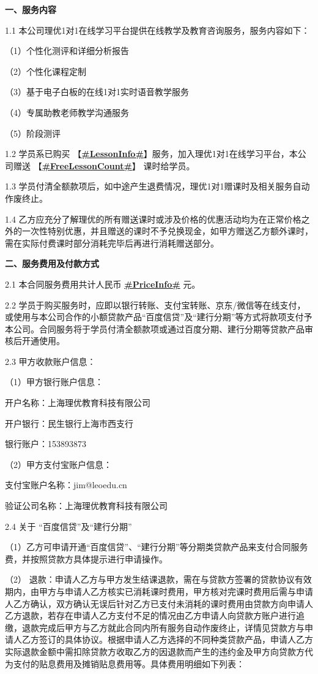 \documentclass {ctexart}
\begin{document}
\textbf{一、服务内容 }

1.1	本公司理优1对1在线学习平台提供在线教学及教育咨询服务，服务内容如下：

（1）个性化测评和详细分析报告	

（2）个性化课程定制

（3）基于电子白板的在线1对1实时语音教学服务	

（4）专属助教老师教学沟通服务

（5）阶段测评

1.2	学员系已购买 【\underline{\textbf{#LessonInfo#}}】服务，加入理优1对1在线学习平台，本公司赠送    【\underline{\textbf{#FreeLessonCount#}}】  课时给学员。

1.3	学员付清全额款项后，如中途产生退费情况，理优1对1赠课时及相关服务自动作废终止。

1.4	乙方应充分了解理优的所有赠送课时或涉及价格的优惠活动均为在正常价格之外的一次性特别优惠，并且赠送的课时不予兑换现金，如甲方赠送乙方额外课时，需在实际付费课时部分消耗完毕后再进行消耗赠送部分。


\newpage
\textbf{二、服务费用及付款方式}

2.1	本合同服务费用共计人民币 \textbf{\underline{#PriceInfo#}} 元。

2.2	学员于购买服务时，应即以银行转账、支付宝转账、京东/微信等在线支付，或使用与本公司合作的小额贷款产品“百度信贷”及“建行分期”等方式将款项支付予本公司。合同服务将于学员付清全额款项或通过百度分期、建行分期等贷款产品审核后开通使用。

2.3	甲方收款账户信息：

（1）甲方银行账户信息：

开户名称：上海理优教育科技有限公司

开户银行：民生银行上海市西支行

银行账户：153893873

（2）甲方支付宝账户信息：

支付宝账户名称：jim@leoedu.cn

验证公司名称：上海理优教育科技有限公司

2.4	关于 “百度信贷”及“建行分期”

（1）乙方可申请开通“百度信贷”、“建行分期”等分期类贷款产品来支付合同服务费，并按照贷款方具体提示进行申请操作。

（2） 退款：申请人乙方与甲方发生结课退款，需在与贷款方签署的贷款协议有效期内，由甲方与申请人乙方核实已消耗课时费用，甲方核对完课时费用后需与申请人乙方确认，双方确认无误后针对乙方已支付未消耗的课时费用由贷款方向申请人乙方退款，若存在申请人乙方支付不足的情况由乙方申请人向贷款方账户进行追缴，退款完成后甲方与乙方就此合同内所有服务自动作废终止，详情见贷款方与申请人乙方签订的具体协议。根据申请人乙方选择的不同种类贷款产品，申请人乙方实际退款金额中需扣除贷款方收取乙方的因退款而产生的违约金及甲方向贷款方代为支付的贴息费用及摊销贴息费用等。具体费用明细如下列表：
\end{document}
